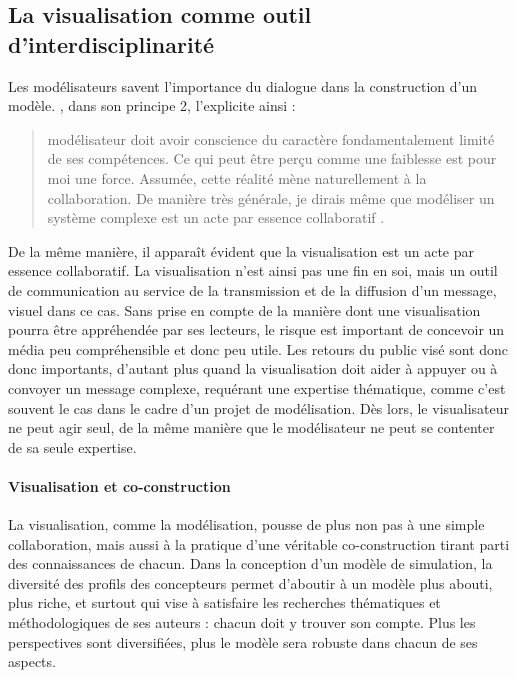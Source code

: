 \documentclass[a4paper, 12pt]{article}
\begin{document}
\subsection{La visualisation comme outil d'interdisciplinarité\label{subsec:visu-interdisciplinarite}}

Les modélisateurs savent l'importance du dialogue dans la construction d'un modèle. , dans son principe 2, l'explicite ainsi : \begin{quote}
\og [Le] modélisateur doit avoir conscience du caractère fondamentalement limité de ses compétences.
Ce qui peut être perçu comme une faiblesse est pour moi une force.
Assumée, cette réalité mène naturellement à la collaboration.
De manière très générale, je dirais même que modéliser un système complexe est un acte par essence collaboratif\fg{}
\flushright\textcite[\ppno~77]{banos_pour_2013}.
\end{quote}

De la même manière, il apparaît évident que la visualisation est \og un acte par essence collaboratif\fg{}.
La visualisation n'est ainsi pas une fin en soi, mais un outil de communication au service de la transmission et de la diffusion d'un message, visuel dans ce cas.
Sans prise en compte de la manière dont une visualisation pourra être appréhendée par ses lecteurs, le risque est important de concevoir un média peu compréhensible et donc peu utile.
Les retours du public visé sont donc donc importants, d'autant plus quand la visualisation doit aider à appuyer ou à convoyer un message complexe, requérant une expertise thématique, comme c'est souvent le cas dans le cadre d'un projet de modélisation.
Dès lors, le visualisateur ne peut agir seul, de la même manière que le modélisateur ne peut se contenter de sa seule expertise.

\paragraph{Visualisation et co-construction}

La visualisation, comme la modélisation, pousse de plus non pas à une simple collaboration, mais aussi à la pratique d'une véritable co-construction tirant parti des connaissances de chacun.
Dans la conception d'un modèle de simulation, la diversité des profils des concepteurs permet d'aboutir à un modèle plus abouti, plus riche, et surtout qui vise à satisfaire les recherches thématiques et méthodologiques de ses auteurs : chacun doit y trouver son compte.
Plus les perspectives sont diversifiées, plus le modèle sera robuste dans chacun de ses aspects.
\end{document}
